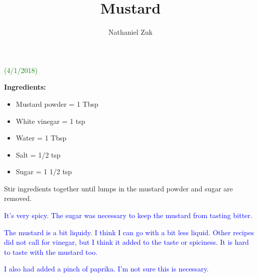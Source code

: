\documentclass[11pt]{article}
\title{Mustard}
\author{Nathaniel Zuk}
\begin{document}
\maketitle

\textcolor{green}{(4/1/2018)}

\textbf{Ingredients:}

\begin{itemize}
\item Mustard powder = 1 Tbsp
\item White vinegar = 1 tsp
\item Water = 1 Tbsp
\item Salt = 1/2 tsp
\item Sugar = 1 1/2 tsp
\end{itemize}

Stir ingredients together until lumps in the mustard powder and sugar are removed.

\textcolor{blue}{It's very spicy.  The sugar was necessary to keep the mustard from tasting bitter.}

\textcolor{blue}{The mustard is a bit liquidy.  I think I can go with a bit less liquid.  Other recipes did not call for vinegar, but I think it added to the taste or spiciness.  It is hard to taste with the mustard too.}

\textcolor{blue}{I also had added a pinch of paprika.  I'm not sure this is necessary.}
\end{document}
